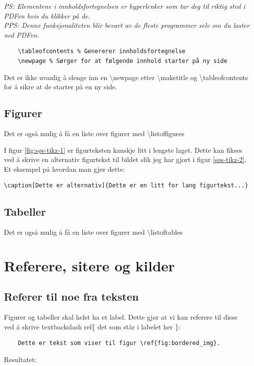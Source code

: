         \textit{PS: Elementene i innholdsfortegnelsen er hyperlenker som tar deg til riktig sted i PDFen hvis du klikker på de.\\
        PPS: Denne funksjonaliteten blir bevart av de fleste programmer selv om du laster ned PDFen.}
        
        \begin{verbatim}
    \tableofcontents % Genererer innholdsfortegnelse
    \newpage % Sørger for at følgende innhold starter på ny side
        \end{verbatim}
        
        Det er ikke uvanlig å slenge inn en \textbackslash newpage etter \textbackslash maketitle og \textbackslash tableofcontents for å sikre at de starter på en ny side.
        
    \subsection{Figurer}
        Det er også mulig å få en liste over figurer med \textbackslash listoffigures 
        \listoffigures
         
        I figur \ref{fig:søs-tikz-1} er figurteksten kanskje litt i lengste laget. Dette kan fikses ved å skrive en alternativ figurtekst til bildet slik jeg har gjort i figur \ref{søs-tikz-2}.
        Et eksempel på hvordan man gjør dette:
        \begin{verbatim}
\caption[Dette er alternativ]{Dette er en litt for lang figurtekst...}
        \end{verbatim}
        
    \subsection{Tabeller}
        Det er også mulig å få en liste over figurer med \textbackslash listoftables
        \listoftables 
        

\section{Referere, sitere og kilder}
    \subsection{Referer til noe fra teksten}
        Figurer og tabeller skal helst ha et label. Dette gjør at vi kan referere til disse ved å skrive textbackslash ref\{ det som står i labelet her \}:
        \begin{verbatim}
    Dette er tekst som viser til figur \ref{fig:bordered_img}.
        \end{verbatim}
        Resultatet:
            
